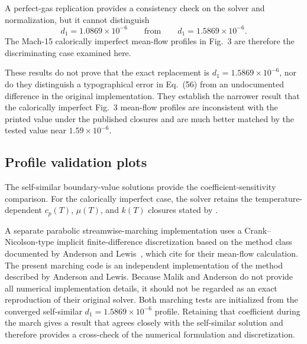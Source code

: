 A perfect-gas replication provides a consistency check on the solver and normalization, but it cannot distinguish
\[
  d_1 = 1.0869\times10^{-6}
  \qquad\text{from}\qquad
  d_1 = 1.5869\times10^{-6}.
\]
The Mach-15 calorically imperfect mean-flow profiles in Fig.~3 are therefore the discriminating case examined here.

These results do not prove that the exact replacement is \(d_1=1.5869\times10^{-6}\), nor do they distinguish a typographical error in Eq.~(56) from an undocumented difference in the original implementation. They establish the narrower result that the calorically imperfect Fig.~3 mean-flow profiles are inconsistent with the printed value under the published closures and are much better matched by the tested value near \(1.59\times10^{-6}\).


\subsection{Profile validation plots}
\label{app:ma:sec:profile_validation_plots}

The self-similar boundary-value solutions provide the coefficient-sensitivity comparison. For the calorically imperfect case, the solver retains the temperature-dependent \(c_p(T)\), \(\mu(T)\), and \(k(T)\) closures stated by \maAppName{}.

A separate parabolic streamwise-marching implementation uses a Crank--Nicolson-type implicit finite-difference discretization based on the method class documented by Anderson and Lewis~\cite{AndersonLewis1971BoundaryLayer}, which \maAppName{} cite for their mean-flow calculation. The present marching code is an independent implementation of the method described by Anderson and Lewis. Because Malik and Anderson do not provide all numerical implementation details, it should not be regarded as an exact reproduction of their original solver. Both marching tests are initialized from the converged self-similar \(d_1=1.5869\times10^{-6}\) profile. Retaining that coefficient during the march gives a result that agrees closely with the self-similar solution and therefore provides a cross-check of the numerical formulation and discretization.

